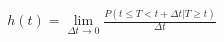 \documentclass[preview]{standalone}
\begin{document}
\begin{align*}
h(t) = \lim_{\Delta t \to 0} \frac{P(t \leq T < t+\Delta t | T \geq t)}{\Delta t}
\end{align*}
\end{document}
